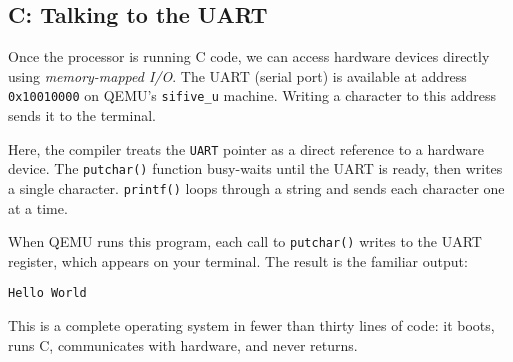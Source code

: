 \subsection{C: Talking to the UART}

Once the processor is running C code, we can access hardware devices directly
using \emph{memory-mapped I/O}.  The UART (serial port) is available at address
\texttt{0x10010000} on QEMU’s \texttt{sifive\_u} machine.  Writing a character
to this address sends it to the terminal.

\begin{figure}[H]
\centering
\begin{minipage}{0.95\textwidth}

\end{minipage}
\end{figure}

Here, the compiler treats the \texttt{UART} pointer as a direct reference to a
hardware device.  The \texttt{putchar()} function busy-waits until the UART is
ready, then writes a single character.  \texttt{printf()} loops through a string
and sends each character one at a time.

\medskip
\noindent
When QEMU runs this program, each call to \texttt{putchar()} writes to the UART
register, which appears on your terminal.  The result is the familiar output:

\begin{lstlisting}
Hello World
\end{lstlisting}

\medskip
\noindent
This is a complete operating system in fewer than thirty lines of code: it
boots, runs C, communicates with hardware, and never returns.

